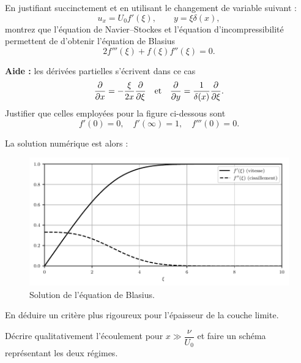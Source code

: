 \begin{questions}
\setcounter{question}{8}
\question En justifiant succinctement et en utilisant le changement de variable suivant :
    $$u_x = U_0 f'(\xi), \qquad y = \xi\delta(x),$$
    montrez que l'équation de Navier--Stockes et l'équation d'incompressibilité permettent de d'obtenir l'équation de Blasius
    $$2 f'''(\xi) + f(\xi) f''(\xi) = 0.$$
    
    \textbf{Aide :} les dérivées partielles s'écrivent dans ce cas
    $$\pdv{}{x} = -\dfrac{\xi}{2x}\pdv{}{\xi} \qqtext{et} \pdv{}{y} = \dfrac{1}{\delta(x)}\pdv{}{\xi}.$$
    \question Justifier que celles employées pour la figure ci-dessous sont
    $$f'(0) = 0,\quad f'(\infty) = 1, \quad f'''(0) = 0.$$
\begin{EnvUplevel}
La solution numérique est alors :
\begin{figure}[H]
    \centering
    \includegraphics[scale=1]{mecaflu/blasius2.pdf}
    \vspace{-1em}
    \caption{Solution de l'équation de Blasius.}
\end{figure}
\end{EnvUplevel}
    \question En déduire un critère plus rigoureux pour l'épaisseur de la couche limite.
\end{questions}

\plusloin
Décrire qualitativement l'écoulement pour $x \gg \dfrac{\nu}{U_0}$ et faire un schéma représentant les deux régimes.

\newpage